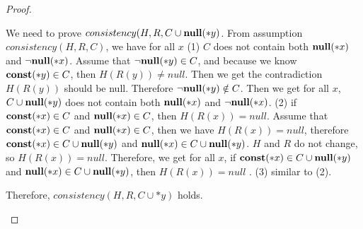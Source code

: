 \begin{proof}
\begin{itemize}
  We need to prove \(consistency(H, R, C\cup{\mathbf{null}(*y)} \). From
  assumption \(consistency(H, R, C)\), we have for all \(x\) (1) \(C\)
  does not contain both \({\bf null}(*x)\) and \(\neg{\bf null}(*x)\). Assume that
  \(\neg\mathbf{null}(*y) \in C\), and because we know \(\mathbf{const}(*y) \in C\),
  then \(H(R(y)) \ne null\). Then we get the contradiction \(H(R(y))\)
  should be null. Therefore \(\neg\mathbf{null}(*y) \notin C\). Then we get
  for all \(x\), \(C \cup{\mathbf{null}(*y)}\) does not contain both
  \({\bf null}(*x)\) and \(\neg{\bf null}(*x)\).  (2) if \(\mathbf{const}(*x) \in C\) and
  \({\bf null}(*x) \in C\), then \(H(R(x)) = null\). Assume that \(\mathbf{const}(*x)
  \in C\) and \({\bf null}(*x) \in C\), then we have \(H(R(x)) = null\),
  therefore\(\mathbf{const}(*x) \in C\cup{\mathbf{null}(*y)}\) and \({\bf null}(*x) \in
  C\cup{\mathbf{null}(*y)}\). \(H\) and \(R\) do not change, so \(H(R(x)) =
  null\). Therefore, we get for all \(x\), if \(\mathbf{const}(*x) \in C\cup{\mathbf{null}(*y)} \)
  and \({\bf null}(*x) \in C\cup{\mathbf{null}(*y)} \), then \(H(R(x)) = null\)
  . (3) similar to (2).
                 
  Therefore, \(consistency(H, R, C\cup{*y})\) holds.
  

 \end{itemize}
\end{proof}



